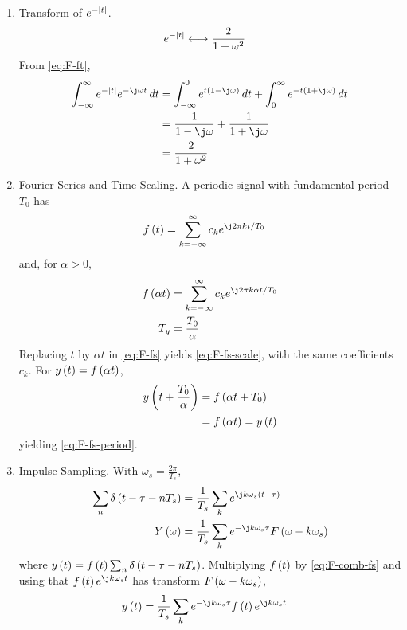 \begin{enumerate}[label=\thesubsection.\arabic*, ref=\thesubsection.\theenumi]
\item Transform of $e^{-\left\vert t\right\vert}$.
\begin{align}
e^{-\left\vert t\right\vert} &\longleftrightarrow \frac{2}{1 + \omega^2}
\label{eq:F-ft-pair}
\end{align}
\solution From \eqref{eq:F-ft},
\begin{align}
\int_{-\infty}^{\infty} e^{-\abs{t}} e^{-\j \omega t} \,dt &= \int_{-\infty}^{0} e^{t\brak{1 - \j \omega}} \,dt + \int_{0}^{\infty} e^{-t\brak{1 + \j \omega}} \,dt
\\
&= \frac{1}{1 - \j \omega} + \frac{1}{1 + \j \omega}
\\
&= \frac{2}{1 + \omega^2}
\end{align}
\item Fourier Series and Time Scaling. A periodic signal with fundamental period $T_0$ has
\begin{align}
f\brak{t} &= \sum_{k = -\infty}^{\infty} c_k e^{\j 2\pi k t / T_0}
\label{eq:F-fs}
\end{align}
and, for $\alpha > 0$,
\begin{align}
f\brak{\alpha t} &= \sum_{k = -\infty}^{\infty} c_k e^{\j 2\pi k \alpha t / T_0}
\label{eq:F-fs-scale}
\\
T_y &= \frac{T_0}{\alpha}
\label{eq:F-fs-period}
\end{align}
\solution Replacing $t$ by $\alpha t$ in \eqref{eq:F-fs} yields \eqref{eq:F-fs-scale}, with the same coefficients $c_k$. For $y\left(t\right) = f\left(\alpha t\right)$,
\begin{align}
y\left(t + \frac{T_0}{\alpha}\right) &= f\left(\alpha t + T_0\right)
\\
&= f\left(\alpha t\right) = y\left(t\right)
\end{align}
yielding \eqref{eq:F-fs-period}.
\item Impulse Sampling. With $\omega_s = \frac{2\pi}{T_s}$,
\begin{align}
\sum_{n} \delta\brak{t - \tau - n T_s} &= \frac{1}{T_s} \sum_{k} e^{\j k \omega_s \brak{t - \tau}}
\label{eq:F-comb-fs}
\\
Y\brak{\omega} &= \frac{1}{T_s} \sum_{k} e^{-\j k \omega_s \tau} F\brak{\omega - k \omega_s}
\label{eq:F-sampled}
\end{align}
where $y\left(t\right) = f\left(t\right) \sum_{n} \delta\left(t - \tau - n T_s\right)$.
\solution Multiplying $f\left(t\right)$ by \eqref{eq:F-comb-fs} and using that $f\brak{t}e^{\j k \omega_s t}$ has transform $F\left(\omega - k\omega_s\right)$,
\begin{align}
y\brak{t} &= \frac{1}{T_s} \sum_{k} e^{-\j k \omega_s \tau} f\brak{t} e^{\j k \omega_s t}

\end{align}
\end{enumerate}
